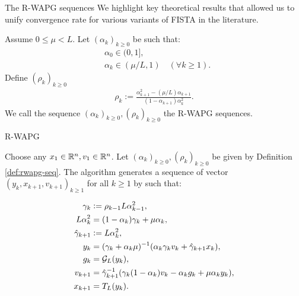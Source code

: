 \documentclass[11pt]{beamer}
\theoremstyle{definition}
\begin{document}
    \begin{frame}{The R-WAPG sequences}
        We highlight key theoretical results that allowed us to unify convergence rate for various variants of FISTA in the literature.
        \begin{definition}\label{def:rwapg-seq}
            Assume $0 \le \mu < L$. 
            Let $(\alpha_k)_{k \ge 0}$ be such that: 
            \begin{align*}
                & \alpha_0 \in (0, 1], \\
                & \alpha_k \in (\mu/L, 1) \quad (\forall k \ge 1). 
            \end{align*}    
            Define $(\rho_k)_{k \ge 0}$
            \begin{align*}
                \rho_k := \frac{\alpha_{k + 1}^2 - (\mu/L) \alpha_{k + 1}}{
                    (1 - \alpha_{k + 1}) \alpha_k^2
                }. 
            \end{align*}
            We call the sequence $(\alpha_k)_{k \ge 0}, (\rho_k)_{k \ge0}$ the R-WAPG sequences. 
        \end{definition}
    \end{frame}
    \begin{frame}{R-WAPG}
        \begin{definition}[R-WAPG]\label{def:wapg}
            Choose any $x_1 \in \mathbb R^n, v_1 \in \mathbb R^n$.
            Let $(\alpha_k)_{k \ge0}, (\rho_k)_{k \ge 0}$ be given by Definition \ref{def:rwapg-seq}.
            The algorithm generates a sequence of vector $(y_k, x_{k + 1}, v_{k + 1})_{k \ge 1}$ for all $k\ge 1$ by such that:
            \begin{tcolorbox}\vspace{-1em}
                \begin{align*}
                    \gamma_k &\vcentcolon= \rho_{k -1}L\alpha_{k - 1}^2,
                    \\
                    L\alpha_k^2 &= (1 - \alpha_k)\gamma_k + \mu \alpha_k, 
                    \\
                    \hat \gamma_{k + 1} & \vcentcolon= L\alpha_k^2,
                    \\
                    y_k &=
                    (\gamma_k + \alpha_k \mu)^{-1}(\alpha_k \gamma_k v_k + \hat\gamma_{k + 1} x_k),
                    \\
                    g_k &= \mathcal G_L (y_k),
                    \\
                    v_{k + 1} &=
                    \hat\gamma^{-1}_{k + 1}
                    (\gamma_k(1 - \alpha_k) v_k - \alpha_k g_k + \mu \alpha_k y_k),
                    \\
                    x_{k + 1} &= T_L (y_k).
                \end{align*}
            \end{tcolorbox}
        \end{definition}
    \end{frame}
\end{document}
